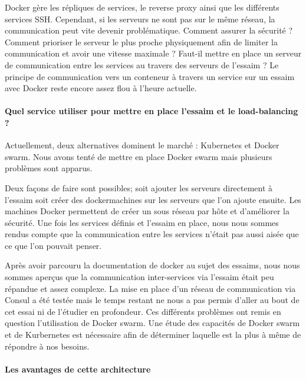 \par Docker gère les répliques de services, le reverse proxy ainsi que les différents services SSH. Cependant, si les serveurs ne sont pas sur le même réseau, la communication peut vite devenir problématique. Comment assurer la sécurité ? Comment prioriser le serveur le plus proche physiquement afin de limiter la communication et avoir une vitesse maximale ? Faut-il mettre en place un serveur de communication entre les services au travers des serveurs de l’essaim ? Le principe de communication vers un conteneur à travers un service sur un essaim avec Docker reste encore assez flou à l’heure actuelle. 

\paragraph{Quel service utiliser pour mettre en place l’essaim et le load-balancing ?}

\par Actuellement, deux alternatives dominent le marché : Kubernetes et Docker swarm. Nous avons tenté de mettre en place Docker swarm mais plusieurs problèmes sont apparus. \\

\par Deux façons de faire sont possibles; soit ajouter les serveurs directement à l’essaim soit créer des \gls{dockermachine}s sur les serveurs que l’on ajoute ensuite. Les machines Docker permettent de créer un sous réseau par hôte et d’améliorer la sécurité. Une fois les services définis et l’essaim en place, nous nous sommes rendus compte que la communication entre les services n’était pas aussi aisée que ce que l’on pouvait penser. 

\par Après avoir parcouru la documentation de docker au sujet des essaims, nous nous sommes aperçus que la communication inter-services via l’\gls{essaim} était peu répandue et assez complexe. La mise en place d’un réseau de communication via Consul a été testée mais le temps restant ne nous a pas permis d’aller au bout de cet essai ni de l’étudier en profondeur. Ces différents problèmes ont remis en question l’utilisation de Docker swarm. Une étude des capacités de Docker swarm et de Kurbernetes est nécessaire afin de déterminer laquelle est la plus à même de répondre à nos besoins.

\paragraph{Les avantages de cette architecture}


